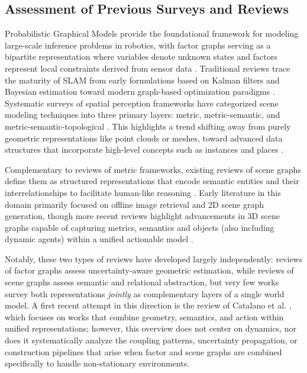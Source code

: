 \subsection{Assessment of Previous Surveys and Reviews}
Probabilistic Graphical Models provide the foundational framework for modeling large-scale inference problems in robotics, with factor graphs serving as a bipartite representation where variables denote unknown states and factors represent local constraints derived from sensor data \cite{dellaert_factor_2021} \cite{dellaert_factor_2017}.
Traditional reviews trace the maturity of SLAM from early formulations based on Kalman filters and Bayesian estimation toward modern graph-based optimization paradigms \cite{mascaro_scene_2025} \cite{luca_carlone_slam_2025}.
Systematic surveys of spatial perception frameworks have categorized scene modeling techniques into three primary layers: metric, metric-semantic, and metric-semantic-topological \cite{mascaro_scene_2025}. 
This highlights a trend shifting away from purely geometric representations like point clouds or meshes, toward advanced data structures that incorporate high-level concepts such as instances and places \cite{bavle_slam_2023}.

Complementary to reviews of metric frameworks, existing reviews of scene graphs define them as structured representations that encode semantic entities and their interrelationships to facilitate human-like reasoning \cite{chang_comprehensive_2023} \cite{amuche_advancements_2025} \cite{lai_review_2022}. 
Early literature in this domain primarily focused on offline image retrieval and 2D scene graph generation, though more recent reviews highlight advancements in 3D scene graphs capable of capturing metrics, semantics and objects (also including dynamic agents) within a unified actionable model \cite{chang_comprehensive_2023} \cite{lai_review_2022}.

Notably, these two types of reviews have developed largely independently: reviews of factor graphs assess uncertainty-aware geometric estimation, while reviews of scene graphs assess semantic and relational abstraction, but very few works survey both representations \emph{jointly} as complementary layers of a single world model. A first recent attempt in this direction is the review of Catalano et al. \cite{catalano_3d_2025}, which focuses on works that combine geometry, semantics, and action within unified representations; however, this overview  does not center on dynamics, nor does it systematically analyze the coupling patterns, uncertainty propagation, or construction pipelines that arise when factor and scene graphs are combined specifically to handle non-stationary environments.

